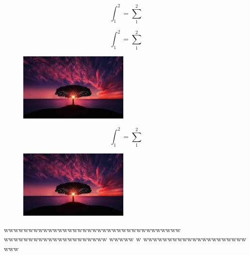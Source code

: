 \documentclass{beamer}
\begin{document}
\begin{frame}
	\begin{equation}\label{key}
		\int_{1}^{2}=\sum_{1}^{2}
	\end{equation}
\end{frame}
\begin{frame}
	\begin{equation}\label{key}
		\int_{1}^{2}=\sum_{1}^{2}
	\end{equation}
	\begin{figure}
		\centering
		\includegraphics[width=0.7\linewidth]{screenshot003}
		\caption{}
		\label{fig:screenshot003}
	\end{figure}
\end{frame}
\begin{frame}
	\begin{equation}\label{key}
		\int_{1}^{2}=\sum_{1}^{2}
	\end{equation}
	\begin{figure}
		\centering
		\includegraphics[width=0.7\linewidth]{screenshot002}
		\caption{}
		\label{fig:screenshot002}
	\end{figure}
 wwwwwwwwwwwwwwwwwwwwwwwwwwwwwwwwwwww	wwwwwwwwwwwwwwwwwwwww	wwwww	w	wwwwwwwwwwwwwwwwwwwww	www
\end{frame}
\end{document}
